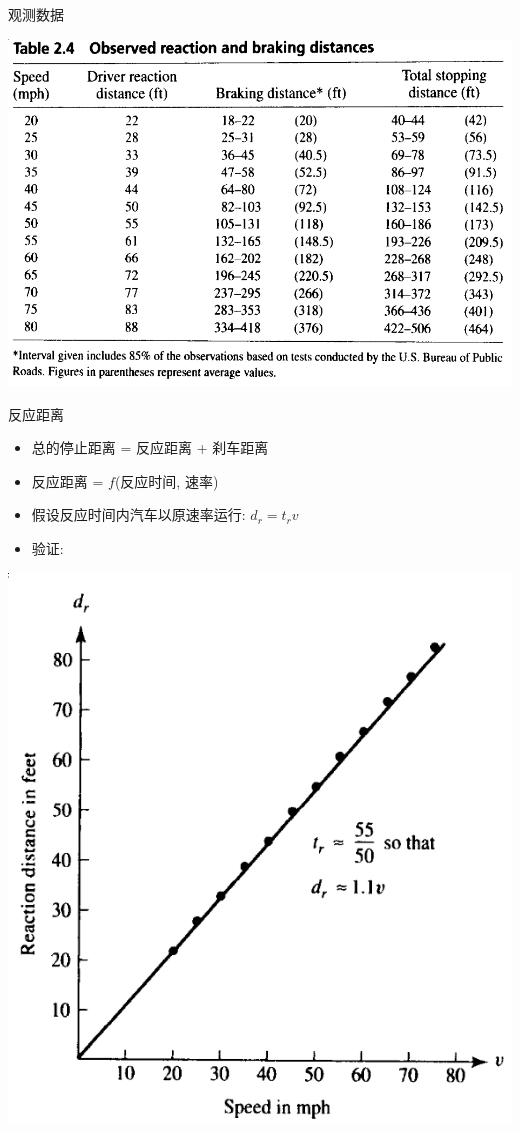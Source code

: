 \documentclass[mathserif]{beamer}
\begin{document}
\begin{frame}{观测数据}
  \begin{center}
    \includegraphics[width=.8\textwidth{}]{cardata.png}
  \end{center}
\end{frame}

\begin{frame}{反应距离}

  \begin{itemize}
  \item 总的停止距离 = 反应距离 + 刹车距离
  \item 反应距离 = $f$(反应时间, 速率)
  \item 假设反应时间内汽车以原速率运行: $d_r = t_rv$
  \item 验证:
  \end{itemize}

  \begin{center}
    \includegraphics[width=.4\textwidth{}]{dr.png}
  \end{center}
\end{frame}
\end{document}
